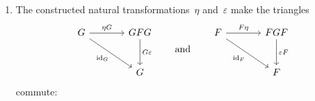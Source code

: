 

\begin{remark}[continues = triangle equalities]
  \leavevmode
  \begin{enumerate}[start=3]
    \item
      The constructed natural transformations~$\eta$ and~$\varepsilon$ make the triangles
      \begin{equation}
        \label{triangle relations}
        \begin{tikzcd}[sep = large]
            G
            \arrow{r}[above]{\eta G}
            \arrow{dr}[below left]{\id_G}
          & GFG
            \arrow{d}[right]{G \varepsilon}
          \\
            {}
          & G
        \end{tikzcd}
        \qquad\text{and}\qquad
        \begin{tikzcd}[sep = large]
            F
            \arrow{r}[above]{F \eta}
            \arrow{dr}[below left]{\id_F}
          & FGF
            \arrow{d}[right]{\varepsilon F}
          \\
            {}
          & F
        \end{tikzcd}
      \end{equation}
      commute:
      

\end{enumerate}
\end{remark}
